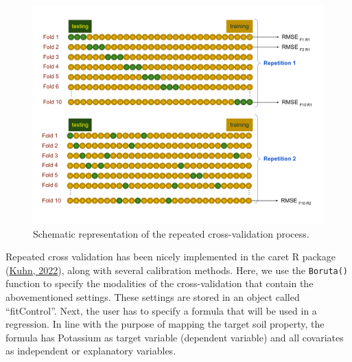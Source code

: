 \documentclass[
  10pt,
  b5paper,
  oneside]{book}
\begin{document}
\begin{figure}
\includegraphics[width=1\linewidth]{images/cv} \caption{Schematic representation of the repeated cross-validation process.}\label{fig:cv}
\end{figure}

Repeated cross validation has been nicely implemented in the caret R package (\protect\hyperlink{ref-Kuhn2022}{Kuhn, 2022}), along with several calibration methods. Here, we use the \texttt{Boruta()} function to specify the modalities of the cross-validation that contain the abovementioned settings. These settings are stored in an object called ``fitControl''. Next, the user has to specify a formula that will be used in a regression. In line with the purpose of mapping the target soil property, the formula has Potassium as target variable (dependent variable) and all covariates as independent or explanatory variables.
\end{document}
